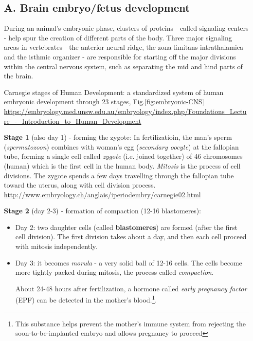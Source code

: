 \subsection{A. Brain embryo/fetus development}
\label{sec:brain_development}


During an animal's embryonic phase, clusters of proteins - called signaling
centers - help spur the creation of different parts of the body. Three major
signaling areas in vertebrates - the anterior neural ridge, the zona limitans
intrathalamica and the isthmic organizer - are responsible for starting off the
major divisions within the central nervous system, such as separating the mid
and hind parts of the brain.

\begin{mdframed}
Carnegie stages of Human Development: a standardized system of human embryonic
development through 23 stages, Fig.\ref{fig:embryonic-CNS}
\url{https://embryology.med.unsw.edu.au/embryology/index.php/Foundations_Lecture_-_Introduction_to_Human_Development}

\label{sec:oocyte}
\label{sec:spermatozoon}
{\bf Stage 1} (also day 1) - forming the zygote:
 In fertilizatioin, the man's sperm
({\it spermatozoon}) combines with woman's egg ({\it secondary oocyte}) at the
fallopian tube, forming a single cell called {\it zygote} (i.e. joined together)
of 46 chromosomes (human) which is the first cell in the human body. {\it
Mitosis} is the process of cell divisions. The zygote spends a few days
travelling through the fallopian tube toward the uterus, along with cell
division process.
\url{http://www.embryology.ch/anglais/iperiodembry/carnegie02.html}

{\bf Stage 2} (day 2-3) - formation of compaction (12-16 blastomeres):
\begin{itemize}
  \label{sec:blastomeres}
  \item Day 2: two daughter cells (called {\bf blastomeres}) are formed (after the first
cell division). The first division takes about a day, and then each cell
proceed with mitosis independently.

\label{sec:morula}
  \item Day 3: it becomes {\it morula} - a very solid ball of 12-16 cells.
The cells become more tightly packed during mitosis, the process called {\it
compaction}. 

\label{sec:EPF}
About 24-48 hours after fertilization, a hormone called {\it early pregnancy
factor} (EPF) can be detected in the mother's blood.\footnote{This substance
helps prevent the mother's immune system from rejecting the soon-to-be-implanted
embryo and allows pregnancy to proceed}.
\end{itemize}


\end{mdframed}
